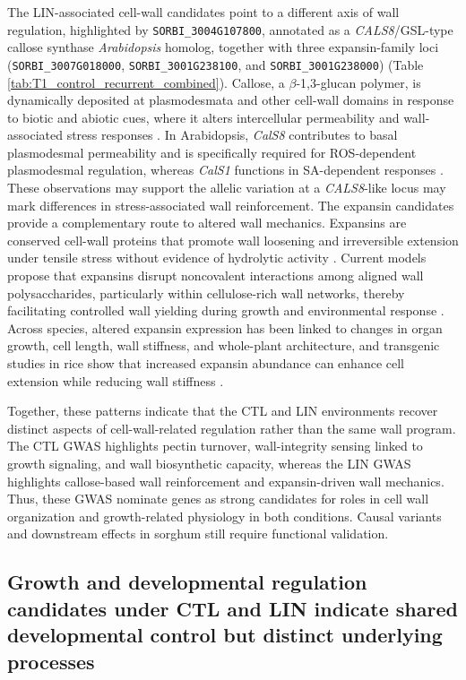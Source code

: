 \documentclass[9pt,twocolumn,twoside]{rilabRxiv}
\begin{document}
The LIN-associated cell-wall candidates point to a different axis of wall regulation, highlighted by \texttt{SORBI\_3004G107800}, annotated as a \textit{CALS8}/GSL-type callose synthase \emph{Arabidopsis} homolog, together with three expansin-family loci (\texttt{SORBI\_3007G018000}, \texttt{SORBI\_3001G238100}, and \texttt{SORBI\_3001G238000}) \citep{Gladman2022SorghumBase} (Table \ref{tab:T1_control_recurrent_combined}). Callose, a $\beta$-1,3-glucan polymer, is dynamically deposited at plasmodesmata and other cell-wall domains in response to biotic and abiotic cues, where it alters intercellular permeability and wall-associated stress responses \citep{CuiLee2016}. In Arabidopsis, \textit{CalS8} contributes to basal plasmodesmal permeability and is specifically required for ROS-dependent plasmodesmal regulation, whereas \textit{CalS1} functions in SA-dependent responses \citep{CuiLee2016}. These observations may support the allelic variation at a \textit{CALS8}-like locus may mark differences in stress-associated wall reinforcement. The expansin candidates provide a complementary route to altered wall mechanics. Expansins are conserved cell-wall proteins that promote wall loosening and irreversible extension under tensile stress without evidence of hydrolytic activity \citep{McQueenMason1992,Cosgrove2024}. Current models propose that expansins disrupt noncovalent interactions among aligned wall polysaccharides, particularly within cellulose-rich wall networks, thereby facilitating controlled wall yielding during growth and environmental response \citep{Cosgrove2024}. Across species, altered expansin expression has been linked to changes in organ growth, cell length, wall stiffness, and whole-plant architecture, and transgenic studies in rice show that increased expansin abundance can enhance cell extension while reducing wall stiffness \citep{Ma2013,Cosgrove2024}.

Together, these patterns indicate that the CTL and LIN environments recover distinct aspects of cell-wall-related regulation rather than the same wall program. The CTL GWAS highlights pectin turnover, wall-integrity sensing linked to growth signaling, and wall biosynthetic capacity, whereas the LIN GWAS highlights callose-based wall reinforcement and expansin-driven wall mechanics. Thus, these GWAS nominate genes as strong candidates for roles in cell wall organization and growth-related physiology in both conditions. Causal variants and downstream effects in sorghum still require functional validation.


\subsection{Growth and developmental regulation candidates under CTL and LIN indicate shared developmental control but distinct underlying processes}
\end{document}

